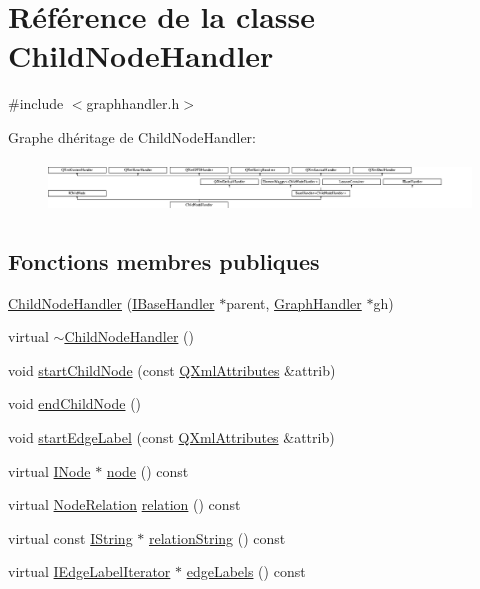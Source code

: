 \hypertarget{class_child_node_handler}{}\section{Référence de la classe Child\+Node\+Handler}
\label{class_child_node_handler}


{\ttfamily \#include $<$graphhandler.\+h$>$}

Graphe d\textquotesingle{}héritage de Child\+Node\+Handler\+:\begin{figure}[H]
\begin{center}
\leavevmode
\includegraphics[height=1.355932cm]{class_child_node_handler}
\end{center}
\end{figure}
\subsection*{Fonctions membres publiques}
\begin{DoxyCompactItemize}
\item 
\hyperlink{class_child_node_handler_ab09cef5eb1b68692b52e79c80026596f}{Child\+Node\+Handler} (\hyperlink{class_i_base_handler}{I\+Base\+Handler} $\ast$parent, \hyperlink{class_graph_handler}{Graph\+Handler} $\ast$gh)
\item 
virtual \hyperlink{class_child_node_handler_a06a51dcc7763caf3730a0e0a16de9ff3}{$\sim$\+Child\+Node\+Handler} ()
\item 
void \hyperlink{class_child_node_handler_a37c31310f83099c2e499571dedd84bc8}{start\+Child\+Node} (const \hyperlink{class_q_xml_attributes}{Q\+Xml\+Attributes} \&attrib)
\item 
void \hyperlink{class_child_node_handler_a4ff67af9ddcfe64aeceb34ded13f7752}{end\+Child\+Node} ()
\item 
void \hyperlink{class_child_node_handler_ae6f1e090610d905f6ddd751fdb4f3605}{start\+Edge\+Label} (const \hyperlink{class_q_xml_attributes}{Q\+Xml\+Attributes} \&attrib)
\item 
virtual \hyperlink{class_i_node}{I\+Node} $\ast$ \hyperlink{class_child_node_handler_a8fb178201a00642734b1e00b503ce357}{node} () const 
\item 
virtual \hyperlink{class_i_child_node_a8f1206e7dd6aba7e62a7e50e2edf8ee2}{Node\+Relation} \hyperlink{class_child_node_handler_a6fa350fcbc6294a988535e8a9eebb22a}{relation} () const 
\item 
virtual const \hyperlink{class_i_string}{I\+String} $\ast$ \hyperlink{class_child_node_handler_a506ac9c2f30e4749c73243da5c1d68be}{relation\+String} () const 
\item 
virtual \hyperlink{class_i_edge_label_iterator}{I\+Edge\+Label\+Iterator} $\ast$ \hyperlink{class_child_node_handler_a1d70693a347b95219ab076810a837c7e}{edge\+Labels} () const 
\end{DoxyCompactItemize}
